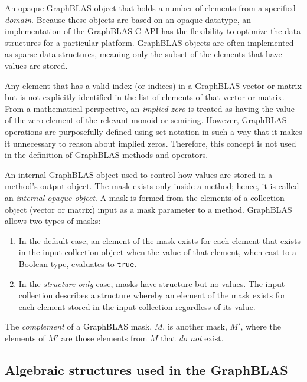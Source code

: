  An opaque GraphBLAS object that holds a number of
elements from a specified \emph{domain}. Because these objects are based on an 
opaque datatype, an implementation of the GraphBLAS C API has the flexibility 
to optimize the data structures for a particular platform.  GraphBLAS objects 
are often implemented as sparse data structures, meaning only the subset of the
elements that have values are stored.

  Any element that has a valid index (or indices) 
in a GraphBLAS vector or matrix but is not explicitly identified in the list of 
elements of that vector or matrix. From a mathematical perspective, an
\emph{implied zero} is treated as having the 
value of the zero element of the relevant monoid or semiring.
However, GraphBLAS operations are purposefully defined using set notation in such a way
that it makes it unnecessary to reason about implied zeros. 
Therefore, this concept is not used in the definition of GraphBLAS methods and operators.

 An internal GraphBLAS object used to control how values 
are stored in a method's output object.  The mask exists only inside a method; hence,
it is called an \emph{internal opaque object}.  A mask is formed from the elements of
a collection object (vector or matrix) input as a mask parameter to a method. GraphBLAS 
allows two types of masks:
\begin{enumerate}
\item In the default 
case, an element of the mask exists for each element that exists in the 
input collection object when the value of that element, when cast to a Boolean type, evaluates to 
{\tt true}.  
\item In the {\it structure only} case, masks have structure but no values. 
The input collection describes a structure whereby an 
element of the mask exists for each element stored in the input collection regardless of its value.
\end{enumerate}

 The \emph{complement} of a 
GraphBLAS mask, $M$, is another mask, $M'$, where the elements of $M'$
are those elements from $M$ that \emph{do not} exist.  
\glossEnd


\subsection{Algebraic structures used in the GraphBLAS}

